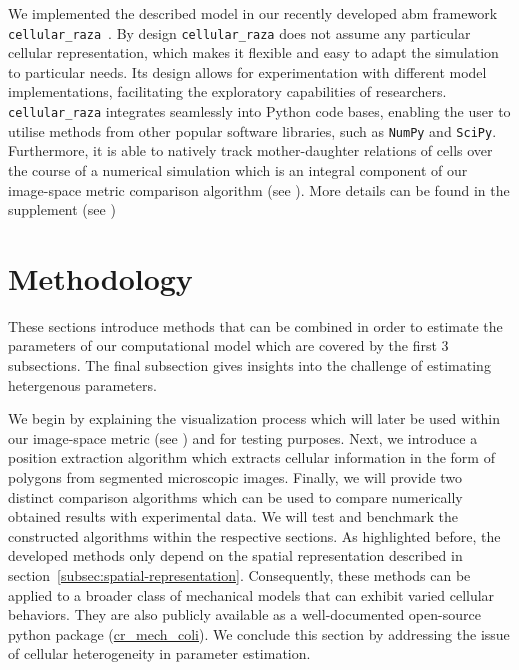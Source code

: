 \documentclass[10pt,letterpaper]{article}
\begin{document}
We implemented the described model in our recently developed \ac{abm} framework
\texttt{cellular\_raza}~\cite{Pleyer2025}.
By design \texttt{cellular\_raza} does not assume any particular cellular representation, which
makes it flexible and easy to adapt the simulation to particular needs.
Its design allows for experimentation with different model implementations, facilitating the
exploratory capabilities of researchers.
\texttt{cellular\_raza} integrates seamlessly into Python code bases, enabling the user to utilise
methods from other popular software libraries, such as \texttt{NumPy} and \texttt{SciPy}.
Furthermore, it is able to natively track mother-daughter relations of cells
over the course of a numerical simulation which is an integral component of our image-space metric
comparison algorithm (see ).
More details can be found in the supplement (see )

\section{Methodology}
\label{sec:methodology}
These sections introduce methods that can be combined in order to estimate the parameters of our
computational model which are covered by the first 3 subsections.
The final subsection gives insights into the challenge of estimating hetergenous parameters.

We begin by explaining the visualization process which will later be used within our image-space
metric (see ) and for testing purposes.
Next, we introduce a position extraction algorithm which extracts cellular information in the form
of polygons from segmented microscopic images.
Finally, we will provide two distinct comparison algorithms which can be used to compare numerically
obtained results with experimental data. We will test and benchmark the constructed algorithms
within the respective sections.
As highlighted before, the developed methods only depend on the spatial representation described in
section~\ref{subsec:spatial-representation}. Consequently, these methods can be applied to a broader
class of mechanical models that can exhibit varied cellular behaviors.
They are also publicly available as a well-documented open-source python package
(\href{https://github.com/jonaspleyer/cr_mech_coli}{cr\_mech\_coli}).
We conclude this section by addressing the issue of cellular heterogeneity in parameter estimation.
\end{document}
